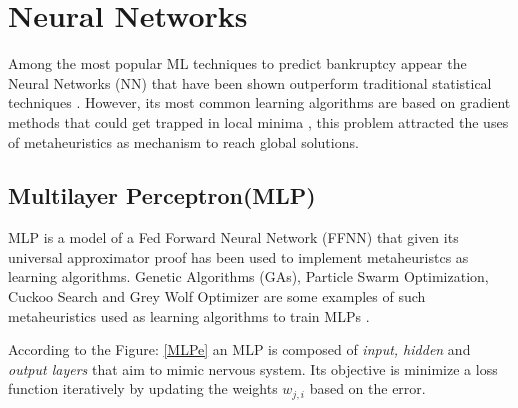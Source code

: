 \documentclass[journal]{IEEEtai}
\begin{document}
\section{Neural Networks}

Among the most popular ML techniques to predict bankruptcy appear the   Neural Networks (NN) that  have been shown outperform traditional statistical techniques \cite{I8}. However, its most common learning algorithms are based on gradient methods that could get trapped in local minima \cite{BPO}, this problem attracted the uses of metaheuristics as mechanism to reach global solutions.


\subsection{Multilayer Perceptron(MLP)}

MLP is a model of a Fed Forward Neural Network (FFNN) that given its universal approximator proof \cite{universal} has been used to implement metaheuristcs as learning algorithms.  Genetic Algorithms (GAs), Particle Swarm Optimization,  Cuckoo Search and Grey Wolf Optimizer are some examples of such metaheuristics used as learning algorithms to train MLPs \cite{REVM}.

According to the Figure: \ref{MLPe} an MLP is composed of \textit{input, hidden} and \textit{output layers} that aim to mimic nervous system. Its objective is minimize a loss  function iteratively by updating  the weights $w_{j,i}$ based on the error.
\end{document}
